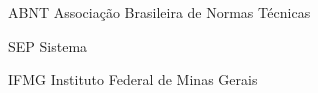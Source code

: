\begin{siglas}
  \item[ABNT] Associação Brasileira de Normas Técnicas
  \item[SEP] Sistema 
  \item[IFMG] Instituto Federal de Minas Gerais
\end{siglas}